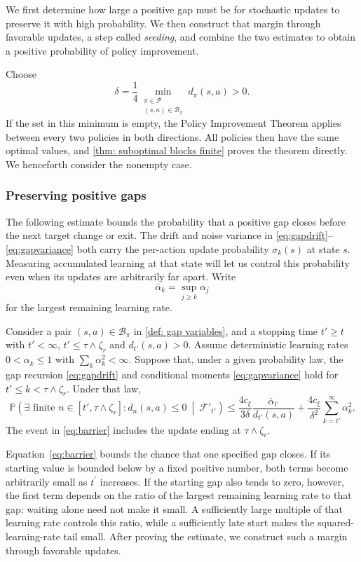 We first determine how large a positive gap must be for stochastic updates to preserve it with high probability. We then construct that margin through favorable updates, a step called \emph{seeding}, and combine the two estimates to obtain a positive probability of policy improvement.

Choose
\begin{equation}
\label{eq:constants}
\delta=\frac14\min_{\substack{\pi\in\mathcal P\\(s,a)\in\mathcal B_\pi}}d_\pi(s,a)>0.
\end{equation}
If the set in this minimum is empty, the Policy Improvement Theorem applies between every two policies in both directions. All policies then have the same optimal values, and \autoref{thm: suboptimal blocks finite} proves the theorem directly. We henceforth consider the nonempty case.

\subsubsection{Preserving positive gaps}
The following estimate bounds the probability that a positive gap closes before the next target change or exit. The drift and noise variance in \eqref{eq:gapdrift}--\eqref{eq:gapvariance} both carry the per-action update probability $\sigma_k(s)$ at state $s$. Measuring accumulated learning at that state will let us control this probability even when its updates are arbitrarily far apart. Write
\[
\bar\alpha_k=\sup_{j\ge k}\alpha_j
\]
for the largest remaining learning rate.

\begin{lemma}
\label{lem:barrier}
Consider a pair $(s,a)\in\mathcal B_\pi$ in \autoref{def: gap variables}, and a stopping time $t'\ge t$ with $t'<\infty$, $t'\le\tau\wedge\zeta_r$ and $d_{t'}(s,a)>0$.
Assume deterministic learning rates $0<\alpha_k\le1$ with $\sum_k\alpha_k^2<\infty$. Suppose that, under a given probability law, the gap recursion \eqref{eq:gapdrift} and conditional moments \eqref{eq:gapvariance} hold for $t'\le k<\tau\wedge\zeta_r$. Under that law,
\begin{equation}
\label{eq:barrier}
\mathbb P\!\left(\exists\text{ finite }n\in[t',\tau\wedge\zeta_r]:d_n(s,a)\le0\ \middle|\ \mathcal F'_{t'}\right)
\le \frac{4c_\xi}{3\delta}\frac{\bar\alpha_{t'}}{d_{t'}(s,a)}
+\frac{4c_\xi}{\delta^2}\sum_{k=t'}^\infty\alpha_k^2.
\end{equation}
The event in \eqref{eq:barrier} includes the update ending at $\tau\wedge\zeta_r$.
\end{lemma}
Equation~\eqref{eq:barrier} bounds the chance that one specified gap closes. If its starting value is bounded below by a fixed positive number, both terms become arbitrarily small as $t^{\prime}$ increases. If the starting gap also tends to zero, however, the first term depends on the ratio of the largest remaining learning rate to that gap: waiting alone need not make it small. A sufficiently large multiple of that learning rate controls this ratio, while a sufficiently late start makes the squared-learning-rate tail small. After proving the estimate, we construct such a margin through favorable updates.

